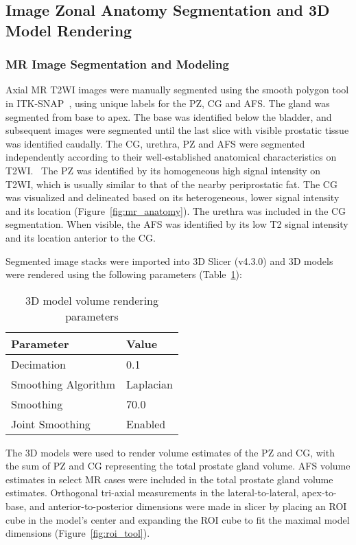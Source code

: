 \subsection{Image Zonal Anatomy Segmentation and 3D Model Rendering}
\subsubsection{MR Image Segmentation and Modeling}
Axial MR T2WI images were manually segmented using the smooth polygon tool in
ITK-SNAP~\cite{Yushkevich2006}, using unique labels for the PZ, CG and AFS. The
gland was segmented from base to apex.  The base was identified below the
bladder, and subsequent images were segmented until the last slice with visible
prostatic tissue was identified caudally. The CG, urethra, PZ and AFS were
segmented independently according to their well-established anatomical
characteristics on
T2WI.~\cite{Barentsz2012,Jung2012,Poon1985,Hricak2007,Bonekamp2011} The PZ was
identified by its homogeneous high signal intensity on T2WI, which is usually
similar to that of the nearby periprostatic fat. The CG was visualized and
delineated based on its heterogeneous, lower signal intensity and its location
(Figure~\ref{fig:mr_anatomy}). The urethra was included in the CG segmentation.
When visible, the AFS was identified by its low T2 signal intensity and its
location anterior to the CG. 



Segmented image stacks were imported into 3D Slicer (v4.3.0) and 3D
models were rendered using the following parameters (Table~\ref{tab:3dslicer}):

\begin{table}[h!]
\centering
\caption{3D model volume rendering parameters}
\begin{tabular}{ll}
{\bf Parameter} & {\bf Value} \\ \hline
Decimation & 0.1 \\
Smoothing Algorithm & Laplacian \\
Smoothing  & 70.0 \\
Joint Smoothing & Enabled \\
\end{tabular}
\label{tab:3dslicer}
\end{table}

The 3D models were used to render volume estimates of the PZ and CG, with the
sum of PZ and CG representing the total prostate gland volume. AFS volume
estimates in select MR cases were included in the total prostate gland volume
estimates. Orthogonal tri-axial measurements in the lateral-to-lateral,
apex-to-base, and anterior-to-posterior dimensions were made in slicer by
placing an ROI cube in the model's center and expanding the ROI cube to fit the
maximal model dimensions (Figure~\ref{fig:roi_tool}). 

